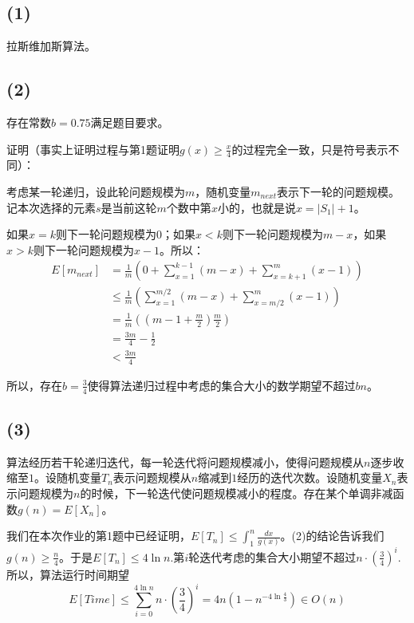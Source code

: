 \documentclass{ctexart}
\begin{document}
\subsection*{(1)}
拉斯维加斯算法。

\subsection*{(2)}
存在常数$b=0.75$满足题目要求。

证明（事实上证明过程与第1题证明$g(x)\ge \frac{x}{4}$的过程完全一致，只是符号表示不同）：

考虑某一轮递归，设此轮问题规模为$m$，随机变量$m_{next}$表示下一轮的问题规模。记本次选择的元素$s$是当前这轮$m$个数中第$x$小的，也就是说$x=|S_1|+1$。

如果$x=k$则下一轮问题规模为0；如果$x<k$则下一轮问题规模为$m-x$，如果$x>k$则下一轮问题规模为$x-1$。所以：
$$
\begin{aligned}
E[m_{next}] &= \frac{1}{m}\left(  0 + \sum_{x=1}^{k-1}(m-x) + \sum_{x=k+1}^m (x-1)  \right)\\
&\le \frac{1}{m} \left( \sum_{x=1}^{m/2}(m-x) + \sum_{x=m/2}^m (x-1) \right)\\
&=\frac{1}{m} \left( \left( m-1+\frac{m}{2} \right)\frac{m}{2} \right)\\
&=\frac{3m}{4}-\frac{1}{2}\\
&< \frac{3m}{4}
\end{aligned}
$$

所以，存在$b=\frac{3}{4}$使得算法递归过程中考虑的集合大小的数学期望不超过$bn$。

\subsection*{(3)}

算法经历若干轮递归迭代，每一轮迭代将问题规模减小，使得问题规模从$n$逐步收缩至$1$。设随机变量$T_n$表示问题规模从$n$缩减到$1$经历的迭代次数。设随机变量$X_n$表示问题规模为$n$的时候，下一轮迭代使问题规模减小的程度。存在某个单调非减函数$g(n)=E[X_n]$。

我们在本次作业的第1题中已经证明，$E[T_n]\le \int_1^n \frac{dx}{g(x)} $。(2)的结论告诉我们$g(n)\ge \frac{n}{4}$。于是$E[T_n]\le 4 \ln n$.第$i$轮迭代考虑的集合大小期望不超过$n\cdot \left(\frac{3}{4}\right)^i$.所以，算法运行时间期望
$$
E[Time]\le \sum_{i=0}^{4\ln n} n\cdot \left(\frac{3}{4}\right)^i = 4n\left( 1-n^{-4 \ln \frac{4}{3}} \right)\in O(n)
$$
\end{document}

